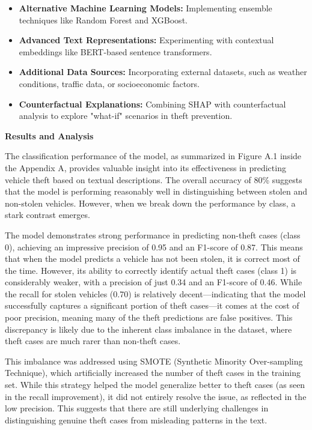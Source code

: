\documentclass[
]{article}
\begin{document}
\begin{itemize}
\item
  \textbf{Alternative Machine Learning Models:} Implementing ensemble
  techniques like Random Forest and XGBoost.
\item
  \textbf{Advanced Text Representations:} Experimenting with contextual
  embeddings like BERT-based sentence transformers.
\item
  \textbf{Additional Data Sources:} Incorporating external datasets,
  such as weather conditions, traffic data, or socioeconomic factors.
\item
  \textbf{Counterfactual Explanations:} Combining SHAP with
  counterfactual analysis to explore "what-if" scenarios in theft
  prevention.
\end{itemize}

\textbf{Results and Analysis}

The classification performance of the model, as summarized in Figure A.1
inside the Appendix A, provides valuable insight into its effectiveness
in predicting vehicle theft based on textual descriptions. The overall
accuracy of 80\% suggests that the model is performing reasonably well
in distinguishing between stolen and non-stolen vehicles. However, when
we break down the performance by class, a stark contrast emerges.

The model demonstrates strong performance in predicting non-theft cases
(class 0), achieving an impressive precision of 0.95 and an F1-score of
0.87. This means that when the model predicts a vehicle has not been
stolen, it is correct most of the time. However, its ability to
correctly identify actual theft cases (class 1) is considerably weaker,
with a precision of just 0.34 and an F1-score of 0.46. While the recall
for stolen vehicles (0.70) is relatively decent---indicating that the
model successfully captures a significant portion of theft cases---it
comes at the cost of poor precision, meaning many of the theft
predictions are false positives. This discrepancy is likely due to the
inherent class imbalance in the dataset, where theft cases are much
rarer than non-theft cases.

This imbalance was addressed using SMOTE (Synthetic Minority
Over-sampling Technique), which artificially increased the number of
theft cases in the training set. While this strategy helped the model
generalize better to theft cases (as seen in the recall improvement), it
did not entirely resolve the issue, as reflected in the low precision.
This suggests that there are still underlying challenges in
distinguishing genuine theft cases from misleading patterns in the text.
\end{document}
